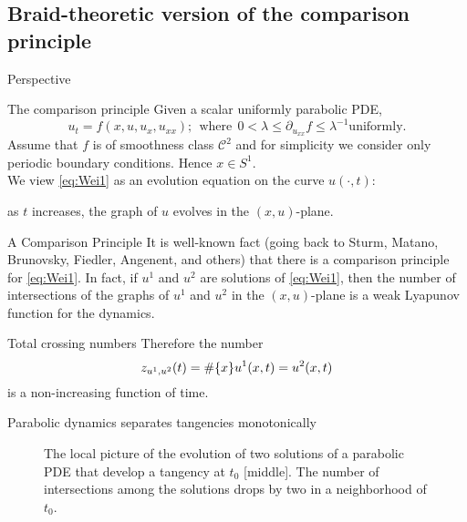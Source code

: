 \documentclass[9pt, english]{beamer}
\theoremstyle{definition}
\begin{document}
\subsection{Braid-theoretic version of the comparison principle}
\begin{frame}{Perspective}
    \begin{block}{The comparison principle}
        Given a scalar uniformly parabolic PDE,
        \begin{equation}\label{eq:Wei1}
        u_t=f(x, u, u_x, u_{xx}); \ \ \textrm{where}\ \ 0<\lambda \leq
        \partial_{u_{xx}}f \leq \lambda^{-1} \textrm{uniformly}.
        \end{equation}\pause
        Assume that $f$ is of smoothness class $\mathscr C^2$ and
        for simplicity we consider only periodic boundary
        conditions. Hence $x \in S^1$.\pause \\
        We view \eqref{eq:Wei1} as an evolution equation on the
        curve $u(\cdot, t):$\pause

        \alert{as $t$ increases, the graph of $u$ evolves in the
        $(x,u)$-plane.}
    \end{block}
\end{frame}
\begin{frame}
    \begin{block}{A Comparison Principle}
        It is well-known fact (going back to Sturm, Matano, Brunovsky,
        Fiedler, Angenent, and others) that there is a \alert{comparison
        principle} for \eqref{eq:Wei1}. \pause
        In fact, if $u^1$ and $u^2$ are  solutions of \eqref{eq:Wei1},
        then the number of intersections of the graphs of $u^1$ and
        $u^2$ in the $(x,u)$-plane is a \alert{weak Lyapunov function
        for the dynamics}.
    \end{block}\pause
    \begin{block}{Total crossing numbers}
        Therefore the number
        {\color{blue}
        \[
        z_{u^1, u^2}(t)=\#{\{{x}\}}{u^1(x,t)=u^2(x,t)}
        \]\/}\pause
        is a non-increasing function of time.
    \end{block}

\end{frame}
\begin{frame}{Parabolic dynamics separates tangencies monotonically}
        \begin{figure}\label{fig:tangencies_separation}
        \caption{The local picture of the evolution of two solutions of
        a parabolic PDE that develop a tangency at $t_0$ [middle]. The number of intersections among the solutions
        drops by two in a neighborhood of $t_0$.}
        \end{figure}
\end{frame}
\end{document}
